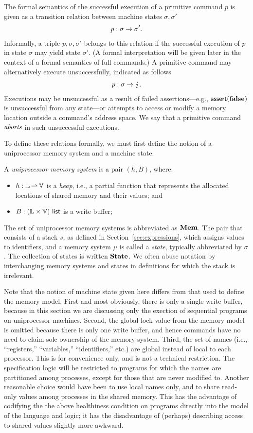 \documentclass[11pt]{report}
\begin{document}
The formal semantics of the successful execution of a primitive command $p$ is given as a transition relation between machine states $\sigma,\sigma'$ \[ p : \sigma \rightarrow \sigma'. \] Informally, a triple $p,\sigma,\sigma'$ belongs to this relation if the successful execution of $p$ in state $\sigma$ may yield state $\sigma'$. (A formal interpretation will be given later in the context of a formal semantics of full commands.) A primitive command may alternatively execute unsuccessfully, indicated as follows \[ p : \sigma \rightarrow \lightning. \] Executions may be unsuccessful as a result of failed assertions---e.g., $\operatorname{\mathsf{assert}}(\mathbf{false})$ is unsuccessful from any state---or attempts to access or modify a memory location outside a command's address space. We say that a primitive command $\emph{aborts}$ in such unsuccessful executions. 

To define these relations formally, we must first define the notion of a uniprocessor memory system and a machine state. 

\begin{definition}
A \emph{uniprocessor memory system} is a pair $(h,B)$, where: \begin{itemize}
    \item $h : \mathbb{L} \operatorname{\rightharpoonup} \mathbb{V}$ is a \emph{heap}, i.e., a partial function that represents the allocated locations of shared memory and their values; and 
    \item $B : (\mathbb{L} \times \mathbb{V})~\mathsf{list}$ is a write buffer;
\end{itemize}
\end{definition} 
The set of uniprocessor memory systems is abbreviated as $\mathbf{Mem}$.
The pair that consists of a stack $s$, as defined in Section~\ref{sec:expressions}, which assigns values to identifiers, and a memory system $\mu$ is called a \emph{state}, typically abbreviated by $\sigma$. The collection of states is written $\mathbf{State}$. We often abuse notation by interchanging memory systems and states in definitions for which the stack is irrelevant. 

Note that the notion of machine state given here differs from that used to define the memory model. First and most obviously, there is only a single write buffer, because in this section we are discussing only the exection of sequential programs on uniprocessor machines. Second, the global lock value from the memory model is omitted because there is only one write buffer, and hence commands have no need to claim sole ownership of the memory system. Third, the set of names (i.e., ``registers,'' ``variables,'' ``identifiers,'' etc.) are global instead of local to each processor. This is for convenience only, and is not a technical restriction. The specification logic will be restricted to programs for which the names are partitioned among processes, except for those that are never modified to. Another reasonable choice would have been to use local names only, and to share read-only values among processes in the shared memory. This has the advantage of codifying the the above healthiness condition on programs directly into the model of the language and logic; it has the disadvantage of (perhaps) describing access to shared values slightly more awkward. 
\end{document}
